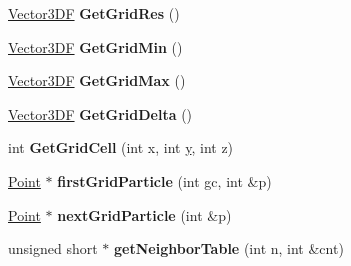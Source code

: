 \begin{DoxyCompactItemize}
\item 
\hypertarget{class_point_set_ac6bfff58fb7e109e83c68af2370cc13d}{\hyperlink{class_vector3_d_f}{Vector3\+D\+F} {\bfseries Get\+Grid\+Res} ()}\label{class_point_set_ac6bfff58fb7e109e83c68af2370cc13d}

\item 
\hypertarget{class_point_set_a46bb2ca664f891b1e79c12704d250ea2}{\hyperlink{class_vector3_d_f}{Vector3\+D\+F} {\bfseries Get\+Grid\+Min} ()}\label{class_point_set_a46bb2ca664f891b1e79c12704d250ea2}

\item 
\hypertarget{class_point_set_abff5624ea92020b7d5ade0377846e559}{\hyperlink{class_vector3_d_f}{Vector3\+D\+F} {\bfseries Get\+Grid\+Max} ()}\label{class_point_set_abff5624ea92020b7d5ade0377846e559}

\item 
\hypertarget{class_point_set_abe8543be92cd9363058a58cea10813af}{\hyperlink{class_vector3_d_f}{Vector3\+D\+F} {\bfseries Get\+Grid\+Delta} ()}\label{class_point_set_abe8543be92cd9363058a58cea10813af}

\item 
\hypertarget{class_point_set_a74f394b3c81c6feeb8126a9cc6dbf430}{int {\bfseries Get\+Grid\+Cell} (int x, int \hyperlink{_ice_utils_8h_aa7ffaed69623192258fb8679569ff9ba}{y}, int z)}\label{class_point_set_a74f394b3c81c6feeb8126a9cc6dbf430}

\item 
\hypertarget{class_point_set_a674678237893cbc3012139e6d51de6cb}{\hyperlink{class_point}{Point} $\ast$ {\bfseries first\+Grid\+Particle} (int gc, int \&p)}\label{class_point_set_a674678237893cbc3012139e6d51de6cb}

\item 
\hypertarget{class_point_set_a7639ac74dae6ba68c6bb0811c55b63bc}{\hyperlink{class_point}{Point} $\ast$ {\bfseries next\+Grid\+Particle} (int \&p)}\label{class_point_set_a7639ac74dae6ba68c6bb0811c55b63bc}

\item 
\hypertarget{class_point_set_a79bf0a118ca139462c22b321e9bee135}{unsigned short $\ast$ {\bfseries get\+Neighbor\+Table} (int n, int \&cnt)}\label{class_point_set_a79bf0a118ca139462c22b321e9bee135}

\end{DoxyCompactItemize}
